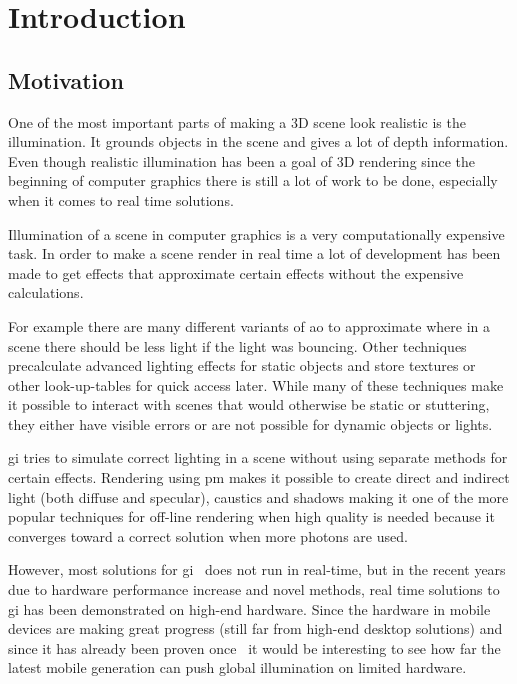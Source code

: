 \chapter{Introduction}\label{cha:intro}

\section{Motivation}

One of the most important parts of making a 3D scene look realistic is the illumination. It grounds objects in the scene and gives a lot of depth information. Even though realistic illumination has been a goal of 3D rendering since the beginning of computer graphics there is still a lot of work to be done, especially when it comes to real time solutions.

Illumination of a scene in computer graphics is a very computationally expensive task. In order to make a scene render in real time a lot of development has been made to get effects that approximate certain effects without the expensive calculations.

For example there are many different variants of \gls{ao} to approximate where in a scene there should be less light if the light was bouncing. Other techniques precalculate advanced lighting effects for static objects and store textures or other look-up-tables for quick access later. While many of these techniques make it possible to interact with scenes that would otherwise be static or stuttering, they either have visible errors or are not possible for dynamic objects or lights.

\gls{gi} tries to simulate correct lighting in a scene without using separate methods for certain effects. Rendering using \gls{pm} makes it possible to create direct and indirect light (both diffuse and specular), caustics and shadows making it one of the more popular techniques for off-line rendering when high quality is needed because it converges toward a correct solution when more photons are used.

However, most solutions for \gls{gi}~\cite{sotagi} does not run in real-time, but in the recent years due to hardware performance increase and novel methods, real time solutions to \gls{gi} has been demonstrated on high-end hardware. Since the hardware in mobile devices are making great progress (still far from high-end desktop solutions) and since it has already been proven once~\cite{gimobile} it would be interesting to see how far the latest mobile generation can push global illumination on limited hardware.

